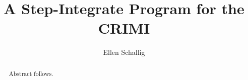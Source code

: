 \documentclass[12pt,a4paper]{article}
\title{A Step-Integrate Program for the CRIMI}
\author{Ellen Schallig}
\begin{document}
 
\maketitle

 \begin{abstract}
 Abstract follows.
 \end{abstract}







\printbibliography
\end{document}
